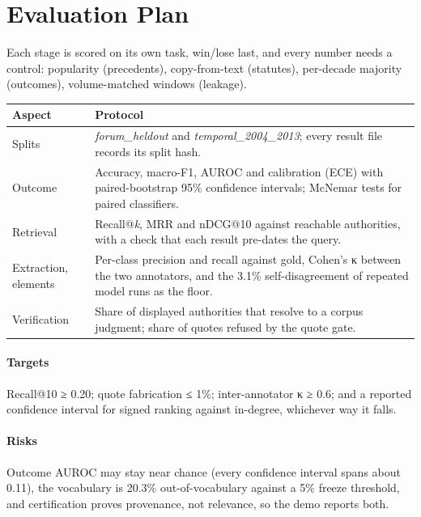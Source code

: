 \documentclass[12pt,a4paper]{article}
\newcommand{\hdr}{\rowcolor{band}}
\begin{document}
\section{Evaluation Plan}
Each stage is scored on its own task, win/lose last, and every number needs a control: popularity
(precedents), copy-from-text (statutes), per-decade majority (outcomes), volume-matched windows (leakage).

\begin{tabularx}{\textwidth}{@{}P{3.1cm}Y@{}}
\toprule
\hdr \textbf{Aspect} & \textbf{Protocol} \\
\midrule
Splits & \emph{forum\_heldout} and \emph{temporal\_2004\_2013}; every result file records its split hash. \\
Outcome & Accuracy, macro-F1, AUROC and calibration (ECE) with paired-bootstrap 95\% confidence intervals; McNemar tests for paired classifiers. \\
Retrieval & Recall@\emph{k}, MRR and nDCG@10 against reachable authorities, with a check that each result pre-dates the query. \\
Extraction, elements & Per-class precision and recall against gold, Cohen's κ between the two annotators, and the 3.1\% self-disagreement of repeated model runs as the floor. \\
Verification & Share of displayed authorities that resolve to a corpus judgment; share of quotes refused by the quote gate. \\
\bottomrule
\end{tabularx}

\paragraph{Targets} Recall@10 ≥ 0.20; quote fabrication ≤ 1\%; inter-annotator κ ≥ 0.6; and a
reported confidence interval for signed ranking against in-degree, whichever way it falls.
\paragraph{Risks} Outcome AUROC may stay near chance (every confidence interval spans about 0.11), the vocabulary is
20.3\% out-of-vocabulary against a 5\% freeze threshold, and certification proves provenance, not
relevance, so the demo reports both.

\end{document}
